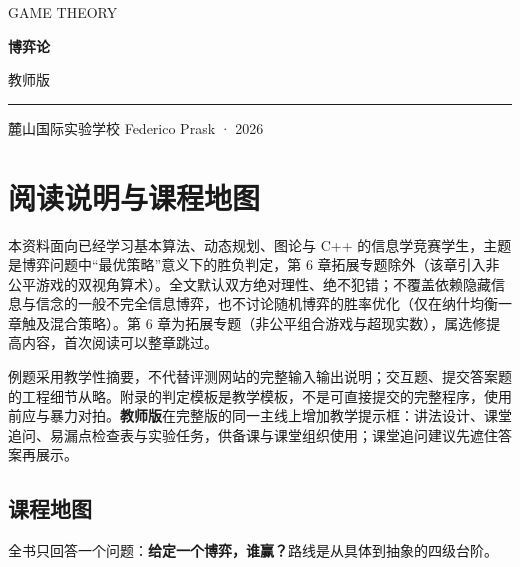 \documentclass[UTF8,a4paper,11pt,oneside,openany,fontset=fandol]{ctexbook}
\theoremstyle{definition}
\begin{document}
\frontmatter
\begin{titlepage}
\setlength{\parindent}{0pt}
\vspace*{1.2cm}
{\large\color{accent}GAME THEORY}\par
\vspace{1cm}
{\fontsize{46}{56}\selectfont\bfseries\color{ink}博弈论}\par
\vspace{0.5cm}
{\Large 教师版}\par
\vspace{0.5cm}
{\color{accent}\rule{\textwidth}{1.2pt}}\par
\vspace{0.3cm}
\begin{minipage}{0.9\textwidth}
\large 麓山国际实验学校 Federico Prask · 2026
\end{minipage}\par
\vfill
{\normalsize }\par
{\small}
\end{titlepage}
\chapter*{阅读说明与课程地图}

\begin{pitfall}[适用范围与阅读边界]
本资料面向已经学习基本算法、动态规划、图论与 C++ 的信息学竞赛学生，主题是博弈问题中“最优策略”意义下的胜负判定，第 6 章拓展专题除外（该章引入非公平游戏的双视角算术）。全文默认双方绝对理性、绝不犯错；不覆盖依赖隐藏信息与信念的一般不完全信息博弈，也不讨论随机博弈的胜率优化（仅在纳什均衡一章触及混合策略）。第 6 章为拓展专题（非公平组合游戏与超现实数），属选修提高内容，首次阅读可以整章跳过。

例题采用教学性摘要，不代替评测网站的完整输入输出说明；交互题、提交答案题的工程细节从略。附录的判定模板是教学模板，不是可直接提交的完整程序，使用前应与暴力对拍。\textbf{教师版}在完整版的同一主线上增加教学提示框：讲法设计、课堂追问、易漏点检查表与实验任务，供备课与课堂组织使用；课堂追问建议先遮住答案再展示。
\end{pitfall}

\section*{课程地图}
全书只回答一个问题：\textbf{给定一个博弈，谁赢？}路线是从具体到抽象的四级台阶。
\end{document}
